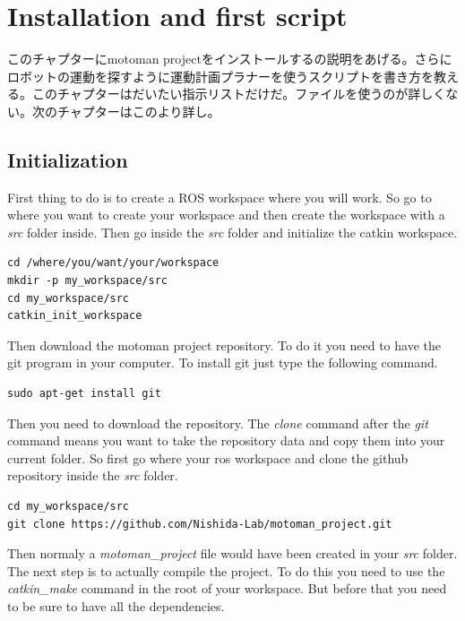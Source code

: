\chapter{Installation and first script}

\begin{CJK}{UTF8}{min}このチャプターにmotoman projectをインストールするの説明をあげる。さらにロボットの運動を探すように運動計画プラナーを使うスクリプトを書き方を教える。このチャプターはだいたい指示リストだけだ。ファイルを使うのが詳しくない。次のチャプターはこのより詳し。\end{CJK}

\section{Initialization}
First thing to do is to create a ROS workspace where you will work.  So go to where you want to create your workspace and then create the workspace with a \emph{src} folder inside. Then go inside the \emph{src} folder and initialize the catkin workspace.

\begin{lstlisting}
cd /where/you/want/your/workspace
mkdir -p my_workspace/src
cd my_workspace/src
catkin_init_workspace
\end{lstlisting}

Then download the motoman project repository. To do it you need to have the git program in your computer. To install git just type the following command.

\begin{lstlisting}
sudo apt-get install git
\end{lstlisting}

Then you need to download the repository. The \emph{clone} command after the \emph{git} command means you want to take the repository data and copy them into your current folder. So first go where your ros workspace and clone the github repository inside the \emph{src} folder.  

\begin{lstlisting}
cd my_workspace/src
git clone https://github.com/Nishida-Lab/motoman_project.git
\end{lstlisting}

Then normaly a \emph{motoman\_project} file would have been created in your \emph{src} folder. The next step is to actually compile the project. To do this you need to use the \emph{catkin\_make} command in the root of your workspace. But before that you need to be sure to have all the dependencies. 


